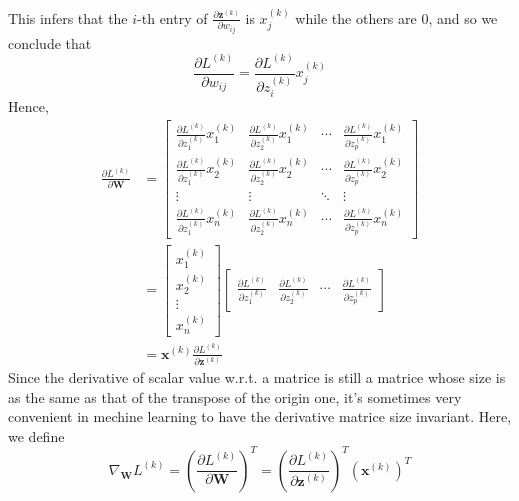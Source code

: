 \documentclass{article}
\newcommand{\Derivative}[2]{\ensuremath{\frac{\partial#1}{\partial#2}}}
\begin{document}
This infers that the $i$-th entry of $\Derivative{\boldsymbol{z}^{(k)}}{w_{ij}}$ is $x^{(k)}_j$ while the others are $0$, and so we conclude that
\begin{equation}
    \Derivative{L^{(k)}}{w_{ij}}=\Derivative{L^{(k)}}{z_i^{(k)}}x^{(k)}_j
\end{equation}
Hence,
\begin{equation}\label{eq:Lk to W}
    \begin{split}
        \Derivative{L^{(k)}}{\boldsymbol{W}}
        &=\begin{bmatrix}
            \Derivative{L^{(k)}}{z_1^{(k)}}x_1^{(k)}&\Derivative{L^{(k)}}{z_2^{(k)}}x_1^{(k)}&\cdots&\Derivative{L^{(k)}}{z_p^{(k)}}x_1^{(k)}\\
            \Derivative{L^{(k)}}{z_1^{(k)}}x_2^{(k)}&\Derivative{L^{(k)}}{z_2^{(k)}}x_2^{(k)}&\cdots&\Derivative{L^{(k)}}{z_p^{(k)}}x_2^{(k)}\\
            \vdots&\vdots&\ddots&\vdots\\
            \Derivative{L^{(k)}}{z_1^{(k)}}x_n^{(k)}&\Derivative{L^{(k)}}{z_2^{(k)}}x_n^{(k)}&\cdots&\Derivative{L^{(k)}}{z_p^{(k)}}x_n^{(k)}
        \end{bmatrix}\\
        &=\begin{bmatrix}
            x_1^{(k)}\\
            x_2^{(k)}\\
            \vdots\\
            x_n^{(k)}
        \end{bmatrix}\begin{bmatrix}
            \Derivative{L^{(k)}}{z_1^{(k)}}&
            \Derivative{L^{(k)}}{z_2^{(k)}}&
            \cdots&
            \Derivative{L^{(k)}}{z_p^{(k)}}
        \end{bmatrix}\\
        &=\boldsymbol{x}^{(k)} \Derivative{L^{(k)}}{\boldsymbol{z}^{(k)}}
    \end{split}
\end{equation}
Since the derivative of scalar value w.r.t. a matrice is still a matrice whose size is as the same as that of the transpose of the origin one, it's sometimes very convenient in mechine learning to have the derivative matrice size invariant. Here, we define
\begin{equation}
    \nabla_{\boldsymbol{W}}L^{(k)}=\left(\Derivative{L^{(k)}}{\boldsymbol{W}}\right)^T=\left(\Derivative{L^{(k)}}{\boldsymbol{z}^{(k)}}\right)^T\left(\boldsymbol{x}^{(k)}\right)^T
\end{equation} 
\end{document}
